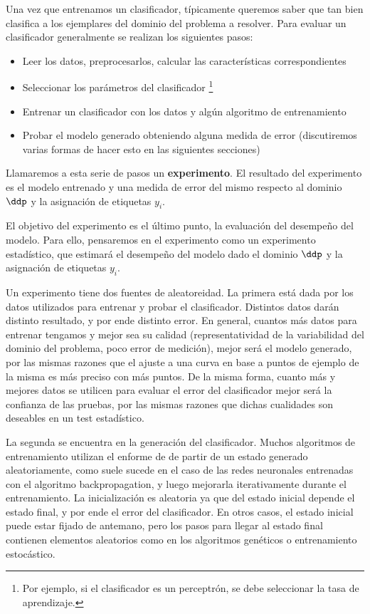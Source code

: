 
Una vez que entrenamos un clasificador, típicamente queremos saber que tan bien clasifica a los ejemplares del dominio del problema a resolver. Para evaluar un clasificador generalmente se realizan los siguientes pasos:

\begin{itemize}
	\item Leer los datos, preprocesarlos, calcular las características correspondientes
  \item Seleccionar los parámetros del clasificador \footnote{Por ejemplo, si el clasificador es un perceptrón, se debe seleccionar la tasa de aprendizaje.}
  \item Entrenar un clasificador con los datos y algún algoritmo de entrenamiento
  \item Probar el modelo generado obteniendo alguna medida de error (discutiremos varias formas de hacer esto en las siguientes secciones)
\end{itemize}

Llamaremos a esta serie de pasos un \textbf{experimento}. El resultado del experimento es el modelo entrenado y una medida de error del mismo respecto al dominio $\ddp$ y la asignación de etiquetas $y_i$.

El objetivo del experimento es el último punto, la evaluación del desempeño del modelo. Para ello, pensaremos en el experimento como un experimento estadístico, que estimará el desempeño del modelo dado el dominio $\ddp$ y la asignación de etiquetas $y_i$.

Un experimento tiene dos fuentes de aleatoreidad. La primera está dada por los datos utilizados para entrenar y probar el clasificador. Distintos datos darán distinto resultado, y por ende distinto error. En general, cuantos más datos para entrenar tengamos y mejor sea su calidad (representatividad de la variabilidad del dominio del problema, poco error de medición), mejor será el modelo generado, por las mismas razones que el ajuste a una curva en base a puntos de ejemplo de la misma es más preciso con más puntos. De la misma forma, cuanto más y mejores datos se utilicen para evaluar el error del clasificador mejor será la confianza de las pruebas, por las mismas razones que dichas cualidades son deseables en un test estadístico.

La segunda se encuentra en la generación del clasificador. Muchos algoritmos de entrenamiento utilizan el enforme de de partir de un estado generado aleatoriamente, como suele sucede en el caso de las redes neuronales entrenadas con el algoritmo backpropagation, y luego mejorarla iterativamente durante el entrenamiento. La inicialización es aleatoria ya que del estado inicial depende el estado final, y por ende el error del clasificador. En otros casos, el estado inicial puede estar fijado de antemano, pero los pasos para llegar al estado final contienen elementos aleatorios como en los algoritmos genéticos o entrenamiento estocástico. 

